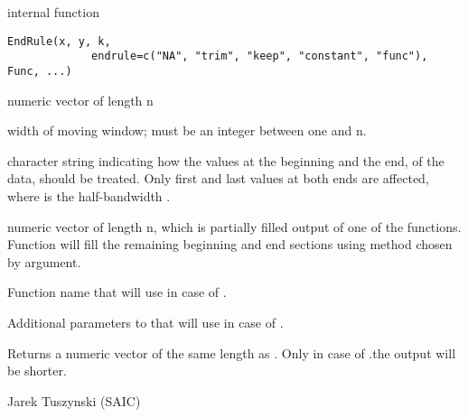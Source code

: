 \begin{Description}\relax
internal function
\end{Description}
\begin{Usage}
\begin{verbatim}EndRule(x, y, k, 
             endrule=c("NA", "trim", "keep", "constant", "func"), Func, ...)\end{verbatim}
\end{Usage}
\begin{Arguments}
\begin{ldescription}
\item[\code{x}] numeric vector of length n
\item[\code{k}] width of moving window; must be an integer between one and n.
\item[\code{endrule}] character string indicating how the values at the beginning 
and the end, of the data, should be treated. Only first and last  
values at both ends are affected, where  is the half-bandwidth 
.

\item[\code{y}] numeric vector of length n, which is partially filled output of 
one of the  functions. Function  will fill the 
remaining beginning and end sections using method chosen by  
argument.
\item[\code{Func}] Function name that  will use in case of 
.
\item[\code{...}] Additional parameters to  that  will 
use in case of .
\end{ldescription}
\end{Arguments}
\begin{Value}
Returns a numeric vector of the same length as . Only in case of 
.the output will be shorter.
\end{Value}
\begin{Author}\relax
Jarek Tuszynski (SAIC) 
\end{Author}

